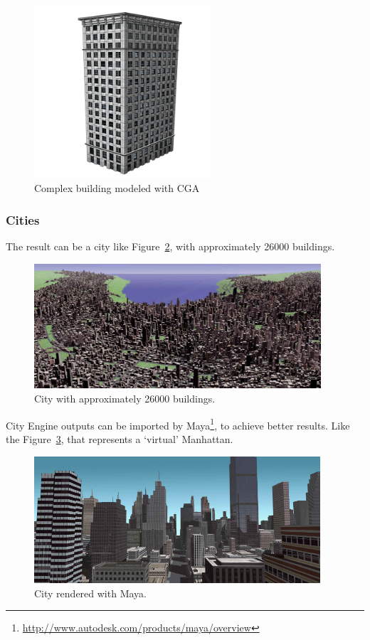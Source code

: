 \begin{figure}[]
  \centering
  \includegraphics[width=0.583\textwidth]{img/Procedural-Modeling-of-Cities/building2.png}
  \caption{Complex building modeled with CGA}
  \label{fig:CEnewbuilding}
\end{figure}


\subsubsection{Cities} %
\label{ssub:Cities1}

The result can be a city like Figure~\ref{fig:bigCity}, with approximately 26000 buildings.

\begin{figure}[htbp]
  \centering
  \includegraphics[width=0.95\textwidth]{img/Procedural-Modeling-of-Cities/City.png}
  \caption{City with approximately 26000 buildings.}
  \label{fig:bigCity}
\end{figure}

City Engine outputs can be imported by Maya\footnote{\url{http://www.autodesk.com/products/maya/overview}}, to achieve better results. Like the Figure~\ref{fig:cityMaya}, that represents a ‘virtual’ Manhattan.

\begin{figure}[htbp]
  \centering
  \includegraphics[width=0.95\textwidth]{img/Procedural-Modeling-of-Cities/City_Maya.png}
  \caption{City rendered with Maya.}
  \label{fig:cityMaya}
\end{figure}

